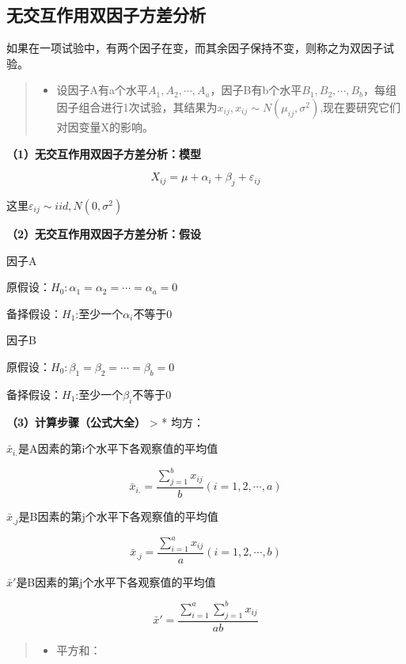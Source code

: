 \documentclass[]{ctexbook}
\providecommand{\tightlist}{%
  \setlength{\itemsep}{0pt}\setlength{\parskip}{0pt}}
\begin{document}
\hypertarget{ux65e0ux4ea4ux4e92ux4f5cux7528ux53ccux56e0ux5b50ux65b9ux5deeux5206ux6790}{%
\subsection{无交互作用双因子方差分析}\label{ux65e0ux4ea4ux4e92ux4f5cux7528ux53ccux56e0ux5b50ux65b9ux5deeux5206ux6790}}

如果在一项试验中，有两个因子在变，而其余因子保持不变，则称之为双因子试验。

\begin{quote}
\begin{itemize}
\tightlist
\item
  设因子A有a个水平\(A_1,A_2,\cdots,A_a\)，因子B有b个水平\(B_1,B_2,\cdots,B_b\)，每组因子组合进行1次试验，其结果为\(x_{ij},x_{ij}\sim N(\mu_{ij},\sigma^2)\),现在要研究它们对因变量X的影响。
\end{itemize}
\end{quote}

\textbf{（1）无交互作用双因子方差分析：模型}

\[X_{ij}=\mu+\alpha_i+\beta_j+\varepsilon_{ij}\]

这里\(\varepsilon_{ij}\sim iid,N(0,\sigma^2)\)

\textbf{（2）无交互作用双因子方差分析：假设}

因子A

原假设：\(H_0:\alpha_1= \alpha_2=\cdots= \alpha_a=0\)

备择假设：\(H_1\):至少一个\(\alpha_i\)不等于0

因子B

原假设：\(H_0: \beta_1 = \beta_2 =\cdots= \beta_b=0\)

备择假设：\(H_1\):至少一个\(\beta_i\)不等于0

\textbf{（3）计算步骤（公式大全）}
\textgreater{} * 均方：

\(\bar x_{i.}\)是A因素的第i个水平下各观察值的平均值

\[\bar x_{i.}=\frac{\sum_{j=1}^bx_{ij}}{b}(i=1,2,\cdots,a)\]

\(\bar x_{.j}\)是B因素的第j个水平下各观察值的平均值

\[\bar x_{.j}=\frac{\sum_{i=1}^ax_{ij}}{a}(i=1,2,\cdots,b)\]

\(\bar x'\)是B因素的第j个水平下各观察值的平均值

\[\bar x'=\frac{\sum_{i=1}^a\sum_{j=1}^bx_{ij}}{ab}\]

\begin{quote}
\begin{itemize}
\tightlist
\item
  平方和：
\end{itemize}
\end{quote}
\end{document}
